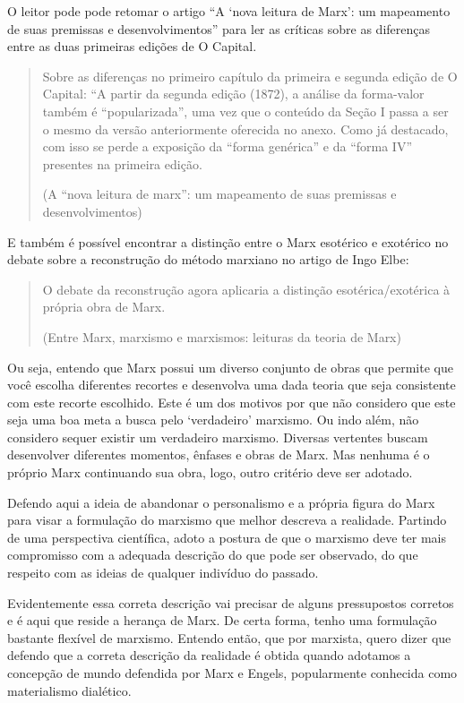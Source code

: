 O leitor pode pode retomar o artigo “A ‘nova leitura de Marx’: um mapeamento de suas premissas e desenvolvimentos” para ler as críticas sobre as diferenças entre as duas primeiras edições de O Capital.

\begin{quote}
Sobre as diferenças no primeiro capítulo da primeira e segunda edição de O Capital: “A partir da segunda edição (1872), a análise da forma-valor também é “popularizada”, uma vez que o conteúdo da Seção I passa a ser o mesmo da versão anteriormente oferecida no anexo. Como já destacado, com isso se perde a exposição da “forma genérica” e da “forma IV” presentes na primeira edição.

(A “nova leitura de marx”: um mapeamento de suas premissas e desenvolvimentos)
\end{quote}

E também é possível encontrar a distinção entre o Marx esotérico e exotérico no debate sobre a reconstrução do método marxiano no artigo de Ingo Elbe:

\begin{quote}
O debate da reconstrução agora aplicaria a distinção esotérica/exotérica à própria obra de Marx.

(Entre Marx, marxismo e marxismos: leituras da teoria de Marx)
\end{quote}

Ou seja, entendo que Marx possui um diverso conjunto de obras que permite que você escolha diferentes recortes e desenvolva uma dada teoria que seja consistente com este recorte escolhido. Este é um dos motivos por que não considero que este seja uma boa meta a busca pelo ‘verdadeiro’ marxismo. Ou indo além, não considero sequer existir um verdadeiro marxismo. Diversas vertentes buscam desenvolver diferentes momentos, ênfases e obras de Marx. Mas nenhuma é o próprio Marx continuando sua obra, logo, outro critério deve ser adotado.

Defendo aqui a ideia de abandonar o personalismo e a própria figura do Marx para visar a formulação do marxismo que melhor descreva a realidade. Partindo de uma perspectiva científica, adoto a postura de que o marxismo deve ter mais compromisso com a adequada descrição do que pode ser observado, do que respeito com as ideias de qualquer indivíduo do passado.

Evidentemente essa correta descrição vai precisar de alguns pressupostos corretos e é aqui que reside a herança de Marx. De certa forma, tenho uma formulação bastante flexível de marxismo. Entendo então, que por marxista, quero dizer que defendo que a correta descrição da realidade é obtida quando adotamos a concepção de mundo defendida por Marx e Engels, popularmente conhecida como materialismo dialético.

